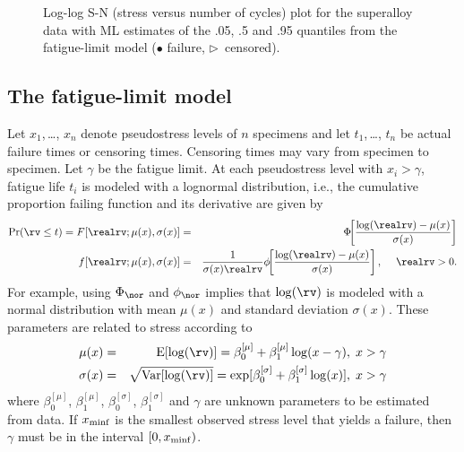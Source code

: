 \begin{figure}
\caption{Log-log S-N (stress versus number of cycles)
plot for the superalloy data with ML
estimates of the .05, .5 and .95 quantiles from the fatigue-limit
model ($\bullet$ failure, $\triangleright$~censored).}
\label{figure:nelson.scatter.ps}
\end{figure}

\subsection{The fatigue-limit model}
Let $x_{1}$,\,\ldots, $x_{n}$ denote pseudostress levels of $n$
specimens and let $t_{1}$,\,\ldots, $t_{n}$ be actual failure times
or censoring times. Censoring times may vary from specimen to specimen.  Let
$\gamma$ be the fatigue limit.  At each pseudostress level with
$x_{i}>\gamma$, fatigue life $t_{i}$ is modeled with a lognormal
distribution, i.e., the cumulative proportion failing function and
its derivative are given by
\begin{eqnarray}
\label{equation:fatigue.limit.cdf}
\Pr(\rv \leq t)=
F[\realrv;\mu(x),\sigma(x)]&=&\Phi\hspace{-1.2 mm}\left[\frac{\log(\realrv)-\mu(x)}{\sigma(x)}\right]\\
f[\realrv;\mu(x),\sigma(x)]&=&\frac{1}{
	\sigma(x)\realrv}\phi\hspace{-1.2 mm}
	\left[\frac{\log(\realrv)-\mu(x)}{\sigma(x)}\right], 
	\;\quad\realrv>0. \nonumber
\end{eqnarray}
For example, using $\Phi_{\nor}$ and $\phi_{\nor}$ implies that
$\log(\rv)$ is modeled with a normal distribution with mean $\mu(x)$
and standard deviation $\sigma(x)$.  These parameters are related to
stress according to
\begin{eqnarray}
\label{equation:mu.model}
\mu(x)&=&\mbox{E}[\log(\rv)]=
	\beta^{[\mu]}_{0}+\beta^{[\mu]}_{1}\log(x-\gamma),
\;x>\gamma\\
\label{equation:sigma.model}
\sigma(x)&=&\sqrt{\mbox{Var}[\log(\rv)]}=
	\exp[\beta^{[\sigma]}_{0}+\beta^{[\sigma]}_{1}\log(x)],
	\;x>\gamma
\end{eqnarray}
where $\beta^{[\mu]}_{0}$, $\beta^{[\mu]}_{1}$,
$\beta^{[\sigma]}_{0}$, $\beta^{[\sigma]}_{1}$ and $\gamma$ are
unknown parameters to be estimated from data.  If $x_{\rm minf}$ is the
smallest observed stress level that yields a failure, then $\gamma$
must be in the interval $[0,x_{\rm minf})$.
 

